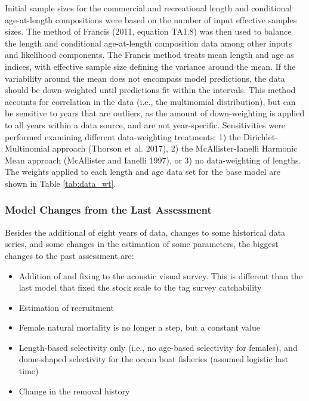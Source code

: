 \documentclass[11pt,
  english,
  letterpaper,
]{article}
\providecommand{\tightlist}{%
  \setlength{\itemsep}{0pt}\setlength{\parskip}{0pt}}
\providecommand{\tightlist}{%
  \setlength{\itemsep}{0pt}\setlength{\parskip}{0pt}}
\begin{document}
Initial sample sizes for the commercial and recreational length and conditional age-at-length compositions were based on the number of input effective samples sizes. The method of Francis (2011, equation TA1.8) was then used to balance the length and conditional age-at-length composition data among other inputs and likelihood components. The Francis method treats mean length and age as indices, with effective sample size defining the variance around the mean. If the variability around the mean does not encompass model predictions, the data should be down-weighted until predictions fit within the intervals. This method accounts for correlation in the data (i.e., the multinomial distribution), but can be sensitive to years that are outliers, as the amount of down-weighting is applied to all years within a data source, and are not year-specific. Sensitivities were performed examining different data-weighting treatments: 1) the Dirichlet-Multinomial approach (Thorson et al. 2017), 2) the McAllister-Ianelli Harmonic Mean approach (McAllister and Ianelli 1997), or 3) no data-weighting of lengths. The weights applied to each length and age data set for the base model are shown in Table \ref{tab:data_wt}.

\hypertarget{model-changes-from-the-last-assessment}{%
\subsubsection{Model Changes from the Last Assessment}\label{model-changes-from-the-last-assessment}}

Besides the additional of eight years of data, changes to some historical data series, and some changes in the estimation of some parameters, the biggest changes to the past assessment are:

\begin{itemize}
\tightlist
\item
  Addition of and fixing to the acoustic visual survey. This is different than the last model that fixed the stock scale to the tag survey catchability
\item
  Estimation of recruitment
\item
  Female natural mortality is no longer a step, but a constant value
\item
  Length-based selectivity only (i.e., no age-based selectivity for females), and dome-shaped selectivity for the ocean boat fisheries (assumed logistic last time)
\item
  Change in the removal history
\end{itemize}
\end{document}

